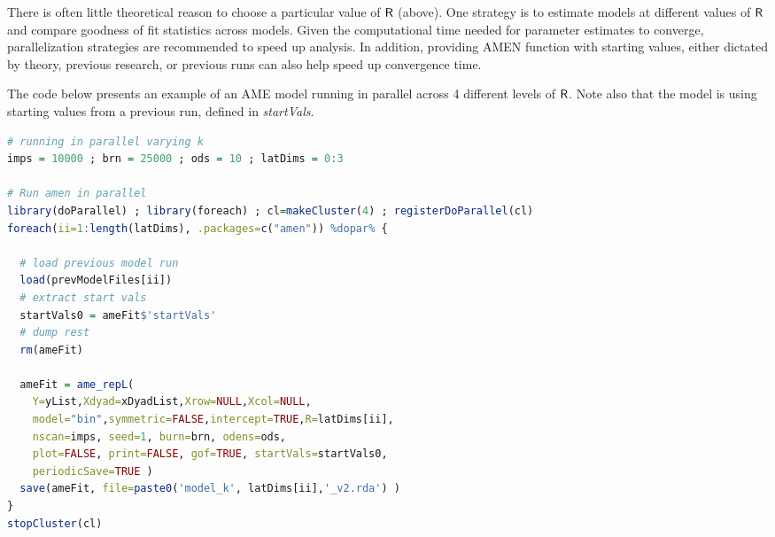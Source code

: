 \documentclass[12pt]{amsart}
\begin{document}
There is often little theoretical reason to choose a particular value of $\sf{R}$ (above). One strategy is to estimate models at different values of $\sf{R}$ and compare goodness of fit statistics across models. Given the computational time needed for parameter estimates to converge, parallelization strategies are recommended to speed up analysis. In addition, providing AMEN function with starting values, either dictated by theory, previous research, or previous runs can also help speed up convergence time.

The code below presents an example of an AME model running in parallel across 4 different levels of $\sf{R}$. Note also that the model is using starting values from a previous run, defined in \textit{startVals}.

\begin{lstlisting}[language=R]
# running in parallel varying k
imps = 10000 ; brn = 25000 ; ods = 10 ; latDims = 0:3

# Run amen in parallel
library(doParallel) ; library(foreach) ; cl=makeCluster(4) ; registerDoParallel(cl)
foreach(ii=1:length(latDims), .packages=c("amen")) %dopar% {

  # load previous model run
  load(prevModelFiles[ii])
  # extract start vals
  startVals0 = ameFit$'startVals'
  # dump rest
  rm(ameFit)

  ameFit = ame_repL(
    Y=yList,Xdyad=xDyadList,Xrow=NULL,Xcol=NULL,
    model="bin",symmetric=FALSE,intercept=TRUE,R=latDims[ii],
    nscan=imps, seed=1, burn=brn, odens=ods,
    plot=FALSE, print=FALSE, gof=TRUE, startVals=startVals0,
    periodicSave=TRUE )
  save(ameFit, file=paste0('model_k', latDims[ii],'_v2.rda') )
}
stopCluster(cl)
\end{lstlisting}
\end{document}
